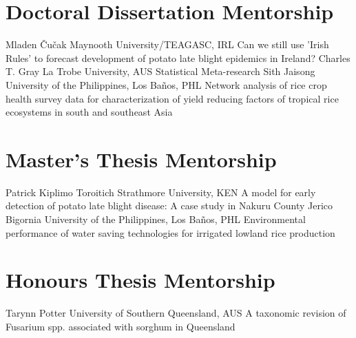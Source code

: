 \section*{Doctoral Dissertation Mentorship}
\begin{entrylist}
    {Mladen \v{C}u\v{c}ak {}}
    {Maynooth University/TEAGASC, IRL}
    {Can we still use 'Irish Rules' to forecast development of potato late blight epidemics in Ireland?}
    {Charles T. Gray {}}
    {La Trobe University, AUS}
    {Statistical Meta-research}
    {Sith Jaisong {}}
    {University of the Philippines, Los Ba\~nos, PHL}
    {Network analysis of rice crop health survey data for characterization of yield reducing factors of tropical rice ecosystems in south and southeast Asia}
\end{entrylist}

\section*{Master's Thesis Mentorship}
\begin{entrylist}
    {Patrick Kiplimo Toroitich {}}
    {Strathmore University, KEN}
    {A model for early detection of potato late blight disease: A case study in Nakuru County}
    {Jerico Bigornia {}}
    {University of the Philippines, Los Ba\~nos, PHL}
    {Environmental performance of water saving technologies for irrigated lowland rice production}
\end{entrylist}

\section*{Honours Thesis Mentorship}
\begin{entrylist}
    {Tarynn Potter {}}
    {University of Southern Queensland, AUS}
    {A taxonomic revision of Fusarium spp. associated with sorghum in Queensland}
\end{entrylist}
